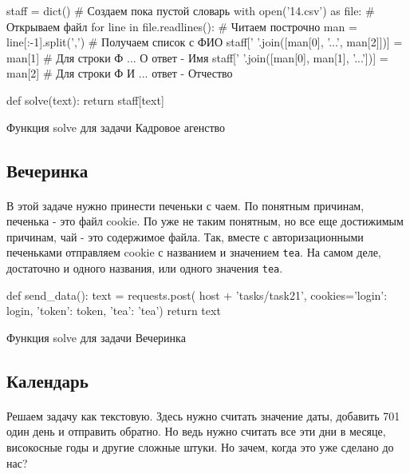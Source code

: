 \documentclass[12pt]{article}
\begin{document}
    \begin{listing}[H]
        \begin{pythoncode}
staff = dict()                                            # Создаем пока пустой словарь
with open('14.csv') as file:                              # Открываем файл
    for line in file.readlines():                         # Читаем построчно
        man = line[:-1].split(',')                        # Получаем список с ФИО
        staff[' '.join([man[0], '...', man[2]])] = man[1] # Для строки Ф ... О ответ - Имя
        staff[' '.join([man[0], man[1], '...'])] = man[2] # Для строки Ф И ... ответ - Отчество

def solve(text):
    return staff[text]
        \end{pythoncode}
        \label{lst:solve14}
        \caption{Функция solve для задачи Кадровое агенство}
    \end{listing}

    \subsection{Вечеринка}
    \paragraph{}
    В этой задаче нужно принести печеньки с чаем.
    По понятным причинам, печенька - это файл cookie.
    По уже не таким понятным, но все еще достижимым причинам, чай - это содержимое файла.
    Так, вместе с авторизационными печеньками отправляем cookie с названием и значением \verb|tea|.
    На самом деле, достаточно и одного названия, или одного значения \verb|tea|.
    \begin{listing}[H]
        \begin{pythoncode}
def send_data():
    text = requests.post(
        host + 'tasks/task21',
        cookies={'login': login, 'token': token, 'tea': 'tea'})
    return text
        \end{pythoncode}
        \label{lst:solve21}
        \caption{Функция solve для задачи Вечеринка}
    \end{listing}

    \subsection{Календарь}
    \paragraph{}
    Решаем задачу как текстовую.
    Здесь нужно считать значение даты, добавить 701 один день и отправить обратно.
    Но ведь нужно считать все эти дни в месяце, високосные годы и другие сложные штуки.
    Но зачем, когда это уже сделано до нас?
\end{document}
